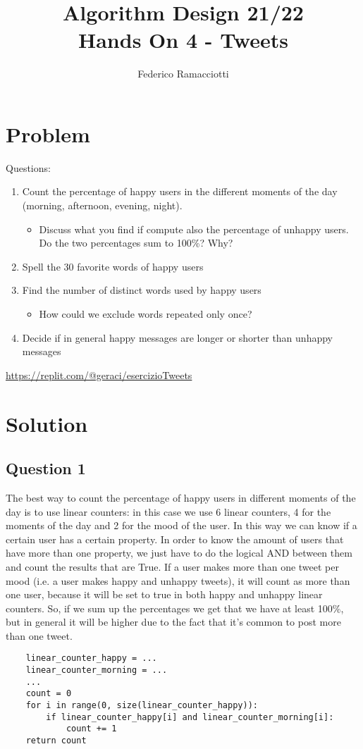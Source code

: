 \documentclass{article}
\title{\LARGE{\textbf{Algorithm Design 21/22}}\\ \vspace{1cm} Hands On 4 - Tweets}
\author{Federico Ramacciotti}
\date{}
\begin{document}
\maketitle

\section{Problem}
Questions:
\begin{enumerate}
    \item Count the percentage of happy users in the different moments of the day (morning, afternoon, evening, night).
    \begin{itemize}
        \item Discuss what you find if compute also the percentage of unhappy users. Do the two percentages sum to 100\%? Why? 
    \end{itemize}
    \item Spell the 30 favorite words of happy users
    \item Find the number of distinct words used by happy users
    \begin{itemize}
        \item How could we exclude words repeated only once?
    \end{itemize}
    \item Decide if in general happy messages are longer or shorter than unhappy messages
\end{enumerate}

\url{https://replit.com/@geraci/esercizioTweets}

\section{Solution}
\subsection{Question 1}
The best way to count the percentage of happy users in different moments of the day is to use linear counters: in this case we use 6 linear counters, 4 for the moments of the day and 2 for the mood of the user. In this way we can know if a certain user has a certain property. In order to know the amount of users that have more than one property, we just have to do the logical AND between them and count the results that are True.
If a user makes more than one tweet per mood (i.e. a user makes happy and unhappy tweets), it will count as more than one user, because it will be set to true in both happy and unhappy linear counters. So, if we sum up the percentages we get that we have at least 100\%, but in general it will be higher due to the fact that it's common to post more than one tweet.
\begin{verbatim}
    linear_counter_happy = ...
    linear_counter_morning = ...
    ...
    count = 0
    for i in range(0, size(linear_counter_happy)):
    	if linear_counter_happy[i] and linear_counter_morning[i]:
    		count += 1
    return count
\end{verbatim}
\end{document}
